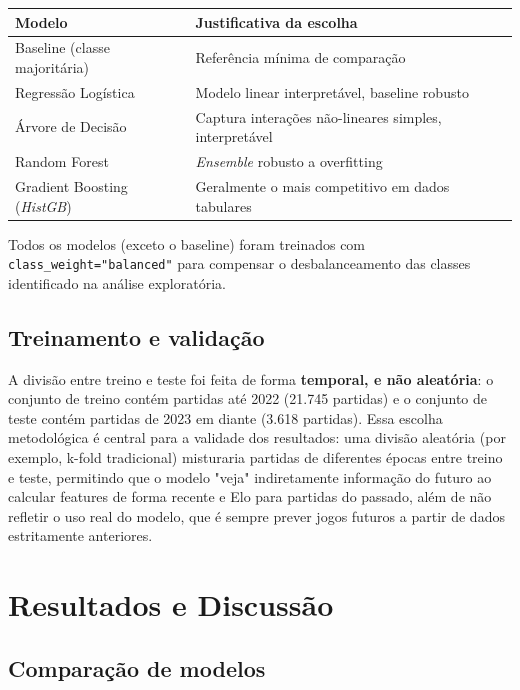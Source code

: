 \documentclass[12pt,a4paper]{article}
\begin{document}
\begin{center}
\small
\begin{tabular}{@{}ll@{}}
\toprule
\textbf{Modelo} & \textbf{Justificativa da escolha} \\
\midrule
Baseline (classe majoritária) & Referência mínima de comparação \\ Regressão Logística & Modelo linear interpretável, baseline robusto \\ Árvore de Decisão & Captura interações não-lineares simples, interpretável \\ Random Forest & \emph{Ensemble} robusto a overfitting \\ Gradient Boosting (\emph{HistGB}) & Geralmente o mais competitivo em dados tabulares \\
\bottomrule
\end{tabular}
\end{center}

Todos os modelos (exceto o baseline) foram treinados com \texttt{class\_weight="balanced"} para compensar o desbalanceamento das classes identificado na análise exploratória.

\subsection{Treinamento e validação}

A divisão entre treino e teste foi feita de forma \textbf{temporal, e não aleatória}: o conjunto de treino contém partidas até 2022 (21.745 partidas) e o conjunto de teste contém partidas de 2023 em diante (3.618 partidas). Essa escolha metodológica é central para a validade dos resultados: uma divisão aleatória (por exemplo, k-fold tradicional) misturaria partidas de diferentes épocas entre treino e teste, permitindo que o modelo "veja" indiretamente informação do futuro ao calcular features de forma recente e Elo para partidas do passado, além de não refletir o uso real do modelo, que é sempre prever jogos futuros a partir de dados estritamente anteriores.

\section{Resultados e Discussão}

\subsection{Comparação de modelos}
\end{document}

